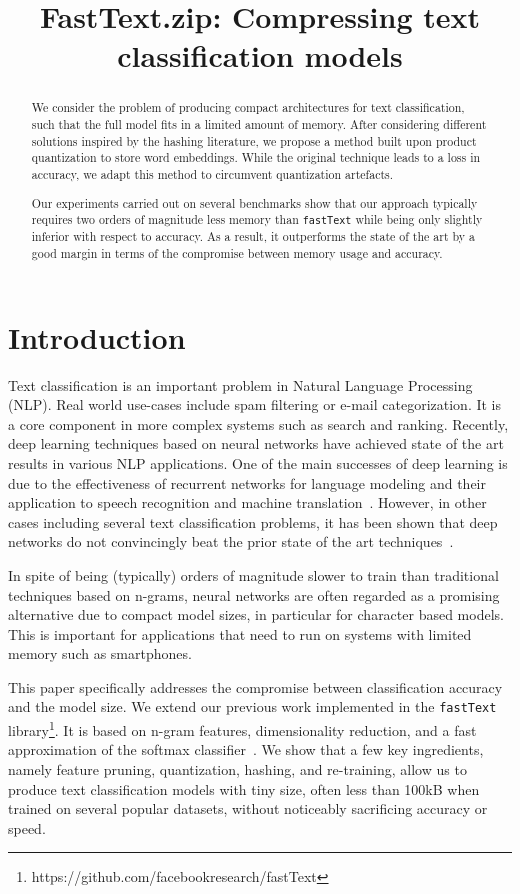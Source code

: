 \title{FastText.zip: Compressing text classification models}

\begin{abstract}
We consider the problem of producing compact architectures for text classification, such that the full model fits in a limited amount of memory. After considering different solutions inspired by the hashing literature, we propose a method built upon product quantization to store word embeddings. While the original technique leads to a loss in accuracy, we adapt this method to circumvent quantization artefacts. 

Our experiments carried out on several benchmarks show that our approach typically requires two orders of magnitude less memory than \texttt{fastText} while being only slightly inferior with respect to accuracy. As a result, it outperforms the state of the art by a good margin in terms of the compromise between memory usage and accuracy.
\end{abstract}

\section{Introduction}

Text classification is an important problem in Natural Language Processing (NLP). Real world use-cases include spam filtering or e-mail categorization. It is a core component in more complex systems such as search and ranking. Recently, deep learning techniques based on neural networks have achieved state of the art results in various NLP applications. One of the main successes of deep learning is due to the effectiveness of recurrent networks for language modeling and their application to speech recognition and machine translation~\citep{mikolov2012}. However, in other cases including several text classification problems, it has been shown that deep networks do not convincingly beat the prior state of the art techniques~\citep{W12,J16}.

In spite of being (typically) orders of magnitude slower to train than traditional techniques based on n-grams, neural networks are often regarded as a promising alternative due to compact model sizes, in particular for character based models. This is important for applications that need to run on systems with limited memory such as smartphones. 

This paper specifically addresses the compromise between classification accuracy and the model size. We extend our previous work implemented in the \texttt{fastText} library\footnote{https://github.com/facebookresearch/fastText}. It is based on n-gram features, dimensionality reduction, and a fast approximation of the softmax classifier~\citep{J16}. We show that a few key ingredients, namely feature pruning, quantization, hashing, and re-training, allow us to produce text classification models with tiny size, often less than 100kB when trained on several popular datasets, without noticeably sacrificing accuracy or speed. 

